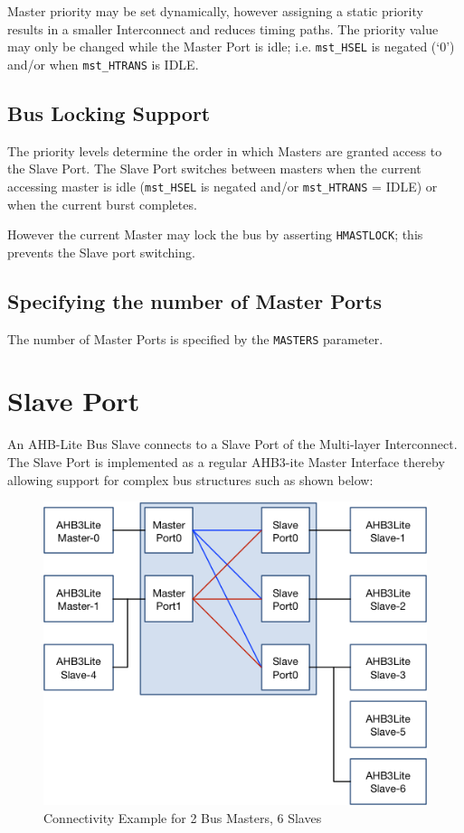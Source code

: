 Master priority may be set dynamically, however assigning a static
priority results in a smaller Interconnect and reduces timing paths. The
priority value may only be changed while the Master Port is idle; i.e.
\texttt{mst\_HSEL} is negated (`0') and/or when \texttt{mst\_HTRANS} is IDLE.

\subsection{Bus Locking Support}\label{bus-locking-support}

The priority levels determine the order in which Masters are granted
access to the Slave Port. The Slave Port switches between masters when
the current accessing master is idle (\texttt{mst\_HSEL} is negated and/or
\texttt{mst\_HTRANS} = IDLE) or when the current burst completes.

However the current Master may lock the bus by asserting \texttt{HMASTLOCK}; this
prevents the Slave port switching.

\subsection{Specifying the number of Master
Ports}\label{specifying-the-number-of-master-ports}

The number of Master Ports is specified by the \texttt{MASTERS} parameter.

\section{Slave Port}\label{slave-port}

An AHB-Lite Bus Slave connects to a Slave Port of the Multi-layer
Interconnect. The Slave Port is implemented as a regular AHB3-ite Master
Interface thereby allowing support for complex bus structures such as
shown below:

\begin{figure}[tbh]
\includegraphics{assets/img/ahb-lite-switch-sys3.png}
\caption{Connectivity Example	for 2 Bus Masters, 6 Slaves}
\label{fig:ahb-lite-switch-sys3}
\end{figure}

